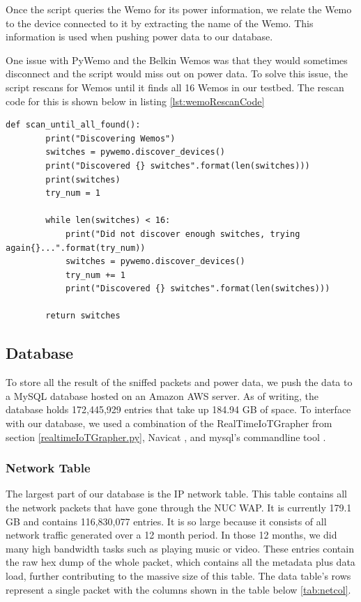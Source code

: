 Once the script queries the Wemo for its power information, we relate the Wemo to the device connected to it by extracting the name of the Wemo. This information is used when pushing power data to our database.

One issue with PyWemo and the Belkin Wemos was that they would sometimes disconnect and the script would miss out on power data. To solve this issue, the script rescans for Wemos until it finds all 16 Wemos in our testbed. The rescan code for this is shown below in listing \ref{lst:wemoRescanCode}

\begin{lstlisting}[label={lst:wemoRescanCode},caption={Rescan if all wemos not found.},captionpos=b]
    def scan_until_all_found():
        print("Discovering Wemos")
        switches = pywemo.discover_devices()
        print("Discovered {} switches".format(len(switches)))
        print(switches)
        try_num = 1

        while len(switches) < 16:
            print("Did not discover enough switches, trying again{}...".format(try_num))
            switches = pywemo.discover_devices()
            try_num += 1
            print("Discovered {} switches".format(len(switches)))

        return switches
    \end{lstlisting}

\subsection{Database}
\label{Database}

To store all the result of the sniffed packets and power data, we push the data to a MySQL database hosted on an Amazon AWS server. As of writing, the database holds 172,445,929 entries that take up 184.94 GB of space. To interface with our database, we used a combination of the RealTimeIoTGrapher from section \ref{realtimeIoTGrapher.py}, Navicat \cite{navicat}, and mysql's commandline tool \cite{mysqlCommandline}.

\subsubsection{Network Table}

The largest part of our database is the IP network table. This table contains all the network packets that have gone through the NUC WAP. It is currently 179.1 GB and contains 116,830,077 entries. It is so large because it consists of all network traffic generated over a 12 month period. In those 12 months, we did many high bandwidth tasks such as playing music or video. These entries contain the raw hex dump of the whole packet, which contains all the metadata plus data load, further contributing to the massive size of this table. The data table's rows represent a single packet with the columns shown in the table below \ref{tab:netcol}.

